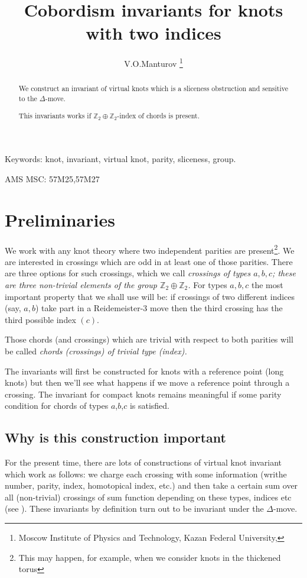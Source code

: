 \documentclass[12pt]{article}
\title{Cobordism invariants for knots with two indices}
\author{V.O.Manturov \footnote{Moscow Institute of Physics and Technology, Kazan Federal University,
}}
\theoremstyle{definition}
\theoremstyle{remark}
\newcommand{\Z}{\mathbb Z}
\begin{document}
\maketitle


\begin{abstract}
We construct an invariant of virtual knots which is a sliceness obstruction
and sensitive to the $\Delta$-move.

This invariants works if $\Z_{2}\oplus \Z_{2}$-index of chords is present.
\end{abstract}

Keywords: knot, invariant, virtual knot, parity, sliceness, group. 

AMS MSC: 57M25,57M27



\section{Preliminaries}
We work with any knot theory where two independent parities are present\footnote{This may happen, for example, when
we consider knots in the thickened torus}. We are interested in crossings which are
odd in at least one of those parities. There are three options for such crossings, which we call {\em crossings of types $a,b,c$;
these are three non-trivial elements of the group $\Z_{2}\oplus \Z_{2}$.}
For types $a,b,c$ the most important property that we
shall use will be: if crossings of two different indices (say, $a,b$) take part in a Reidemeister-3 move then the third crossing
has the third possible index $(c)$.

Those chords (and crossings) which are trivial with respect to both parities will be called {\em chords (crossings) of trivial type (index).} 

The invariants will first be constructed for knots with a reference point (long knots) but then we'll see
what happens if we move a reference point through a crossing.
The invariant for compact knots remains meaningful if some parity condition for chords of types $a$,$b$,$c$ is satisfied.

\subsection{Why is this construction important}

For the present time, there are lots of constructions of virtual knot invariant which work as follows:
we charge each crossing with some information (writhe number, parity, index, homotopical index, etc.) 
and then take a certain sum over all (non-trivial) crossings of sum function depending on these types, indices etc
(see \cite{Cheng,IMN}).
These invariants by definition turn out to be invariant under the $\Delta$-move.
\end{document}

